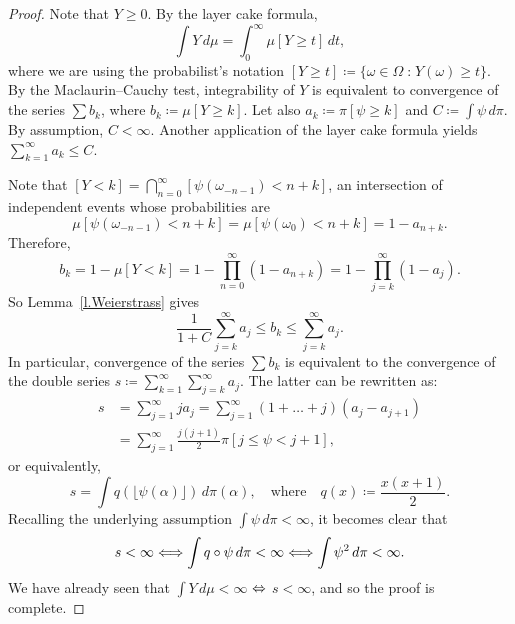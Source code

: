 \documentclass[10pt]{amsart}
\theoremstyle{definition}\newtheorem{defi}[theo]{Definition}\newtheorem{rema}[theo]{Remark}\newtheorem{exam}[theo]{Example}\newtheorem{exem}[theo]{Example}\newtheorem{nota}[theo]{Notation}
\newcommand{\st}{\;\mathord{:}\;}
\let\oldLeftrightarrow\Leftrightarrow
\renewcommand*{\Leftrightarrow}{\mathchoice{\Longleftrightarrow}{\oldLeftrightarrow}{\oldLeftrightarrow}{\oldLeftrightarrow}}
\begin{document}
\begin{proof}
Note that $Y \ge 0$. By the layer cake formula,
\begin{equation}
\int Y \, d\mu = \int_0^\infty \mu [Y \ge t] \, dt,
\end{equation}
where we are using the probabilist's notation $[Y \ge t] \coloneqq \{\omega \in \Omega \st Y(\omega) \ge t \}$. By the Maclaurin--Cauchy test, integrability of $Y$ is equivalent to convergence of the series $\sum b_k$, where $b_k \coloneqq \mu[Y \ge k]$. Let also $a_k \coloneqq \pi[\psi \ge k]$ and $C \coloneqq \int \psi \, d\pi$. By assumption, $C<\infty$. Another application of the layer cake formula yields $\sum_{k=1}^\infty a_k \le C$.

Note that $[Y < k] = \bigcap_{n=0}^\infty [\psi(\omega_{-n-1})<n+k]$, an intersection of independent events whose probabilities are
\begin{equation}
\mu[\psi(\omega_{-n-1})<n+k] = \mu[\psi(\omega_0)<n+k] = 1 - a_{n+k}.
\end{equation}
Therefore,
\begin{equation}
b_k = 1 - \mu[Y<k] = 1 - \prod_{n=0}^\infty (1 - a_{n+k}) = 1 - \prod_{j=k}^\infty (1-a_j).
\end{equation}
So Lemma~\ref{l.Weierstrass} gives
\begin{equation}
\frac{1}{1+C} \sum_{j=k}^\infty a_j \le b_k \le \sum_{j=k}^\infty a_j.
\end{equation}
In particular, convergence of the series $\sum b_k$ is equivalent to the convergence of the double series $s \coloneqq \sum_{k=1}^\infty\sum_{j=k}^\infty a_j$. The latter can be rewritten as:
\begin{equation}
\begin{split}
s &= \sum_{j=1}^\infty j a_j = \sum_{j=1}^\infty (1+\dots+j) (a_j - a_{j+1}) \\
&= \sum_{j=1}^\infty \frac{j(j+1)}{2} \pi[j \le \psi < j+1],
\end{split}
\end{equation}
or equivalently,
\begin{equation}
s = \int q (\lfloor\psi(\alpha) \rfloor ) \, d\pi(\alpha), \quad \text{where} \quad q(x) \coloneqq \frac{x(x+1)}{2}.
\end{equation}
Recalling the underlying assumption $\int \psi \, d\pi < \infty$, it becomes clear that
\begin{equation}
s < \infty  \Leftrightarrow 
\int q \circ \psi \, d\pi < \infty \Leftrightarrow
\int \psi^2 \, d\pi < \infty.
\end{equation}
We have already seen that $\int Y \, d\mu < \infty$ $\Leftrightarrow$ $s<\infty$, and so the proof is complete.
\end{proof}
\end{document}
